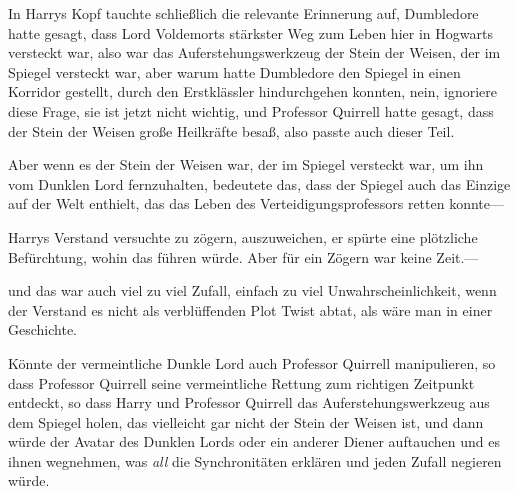 In Harrys Kopf tauchte schließlich die relevante Erinnerung auf, Dumbledore hatte gesagt, dass Lord Voldemorts stärkster Weg zum Leben hier in Hogwarts versteckt war, also war das Auferstehungswerkzeug der Stein der Weisen, der im Spiegel versteckt war, aber warum hatte Dumbledore den Spiegel in einen Korridor gestellt, durch den Erstklässler hindurchgehen konnten, nein, ignoriere diese Frage, sie ist jetzt nicht wichtig, und Professor Quirrell hatte gesagt, dass der Stein der Weisen große Heilkräfte besaß, also passte auch dieser Teil.

Aber wenn es der Stein der Weisen war, der im Spiegel versteckt war, um ihn vom Dunklen Lord fernzuhalten, bedeutete das, dass der Spiegel auch das Einzige auf der Welt enthielt, das das Leben des Verteidigungsprofessors retten konnte—

Harrys Verstand versuchte zu zögern, auszuweichen, er spürte eine plötzliche Befürchtung, wohin das führen würde. Aber für ein Zögern war keine Zeit.—

und das war auch viel zu viel Zufall, einfach zu viel Unwahrscheinlichkeit, wenn der Verstand es nicht als verblüffenden Plot Twist abtat, als wäre man in einer Geschichte.

Könnte der vermeintliche Dunkle Lord auch Professor Quirrell manipulieren, so dass Professor Quirrell seine vermeintliche Rettung zum richtigen Zeitpunkt entdeckt, so dass Harry und Professor Quirrell das Auferstehungswerkzeug aus dem Spiegel holen, das vielleicht gar nicht der Stein der Weisen ist, und dann würde der Avatar des Dunklen Lords oder ein anderer Diener auftauchen und es ihnen wegnehmen, was \emph{all} die Synchronitäten erklären und jeden Zufall negieren würde.

